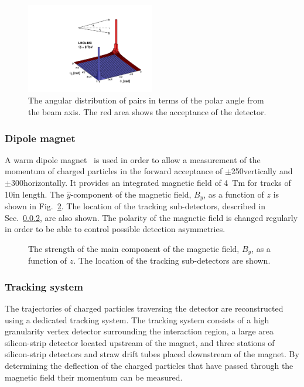 \begin{figure}[!tb]
\centering
\includegraphics[width=0.5\textwidth]{figs/detector/b_bbar_correlation.pdf}
\caption{The angular distribution of \bquark\bquarkbar pairs in terms of the polar angle from the beam axis. The red area shows the acceptance of the \lhcb detector.}
\label{fig:b_bbar_correlation}
\end{figure}


\subsubsection{Dipole magnet}

A warm dipole magnet~\cite{LHCb-TDR-001} is used in order to allow a measurement of the momentum of charged particles in the forward acceptance of $\pm$250\mrad vertically and $\pm$300\mrad horizontally. It provides an integrated magnetic field of 4~Tm for tracks of 10\m in length. The $\hat{y}$-component of the magnetic field, $B_{y}$, as a function of $z$ is shown in Fig.~\ref{fig:magnet}. The location of the tracking sub-detectors, described in Sec.~\ref{sec:lhcb:tracking}, are also shown. The polarity of the magnetic field is changed regularly in order to be able to control possible detection asymmetries.

\begin{figure}[!tb]
\centering
{}
\caption{The strength of the main component of the magnetic field, $B_{y}$, as a function of $z$. The location of the tracking sub-detectors are shown.}
\label{fig:magnet}
\end{figure}

\subsubsection{Tracking system}
\label{sec:lhcb:tracking}

The trajectories of charged particles traversing the \lhcb detector are reconstructed using a dedicated tracking system. The tracking system consists of a high granularity vertex detector surrounding the \proton\proton interaction region, a large area silicon-strip detector located upstream of the magnet, and three stations of silicon-strip detectors and straw drift tubes placed downstream of the magnet. By determining the deflection of the charged particles that have passed through the magnetic field their momentum can be measured.

